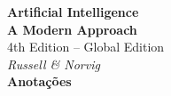 \documentclass[12pt]{article}
\begin{document}
\pagestyle{empty}

\begin{titlepage}
    \begin{center}
        {\Huge\bfseries\color{aiBlue}Artificial Intelligence}\\
        \vspace{0.4cm}
        {\Large\textbf{\color{aiGray}A Modern Approach}}\\
        {\large\color{aiBlue}4th Edition -- Global Edition}\\
        \vspace{0.2cm}
        {\color{aiGray}\textit{Russell \& Norvig}}\\
        \vspace{1cm}
        {\large\textbf{Anotações}}\\
        \vfill
    \end{center}
    \tableofcontents
    \thispagestyle{empty}
\end{titlepage}




\end{document}
